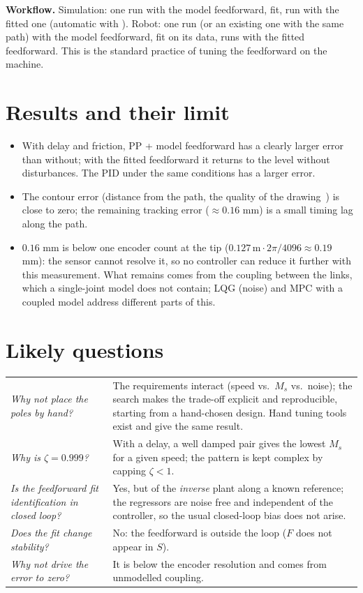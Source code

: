 \documentclass[10pt,a4paper]{article}
\newcommand{\code}[1]{\texttt{\detokenize{#1}}}
\begin{document}
\textbf{Workflow.} Simulation: one run with the model feedforward, fit, run with the fitted one (automatic with
\code{ff_source='sim'}). Robot: one run (or an existing one with the same path) with the model feedforward, fit on its data,
runs with the fitted feedforward. This is the standard practice of tuning the feedforward on the machine.

\section{Results and their limit}

\begin{itemize}
  \item With delay and friction, PP + model feedforward has a clearly larger error than without; with the fitted feedforward it
        returns to the level without disturbances. The PID under the same conditions has a larger error.
  \item The contour error (distance from the path, the quality of the drawing~\cite{koren80}) is close to zero; the remaining
        tracking error ($\approx0.16$ mm) is a small timing lag along the path.
  \item $0.16$ mm is below one encoder count at the tip ($0.127\,\text{m}\cdot2\pi/4096\approx0.19$ mm): the sensor cannot
        resolve it, so no controller can reduce it further with this measurement. What remains comes from the coupling between the
        links, which a single-joint model does not contain; LQG (noise) and MPC with a coupled model address different parts of
        this.
\end{itemize}

\section*{Likely questions}
\begin{tabularx}{\linewidth}{@{}>{\itshape}p{5.2cm} X@{}}
\toprule
Why not place the poles by hand? & The requirements interact (speed vs.\ $M_s$ vs.\ noise); the search makes the trade-off
  explicit and reproducible, starting from a hand-chosen design. Hand tuning tools exist and give the same result. \\
Why is $\zeta=0.999$? & With a delay, a well damped pair gives the lowest $M_s$ for a given speed; the pattern is kept complex by
  capping $\zeta<1$. \\
Is the feedforward fit identification in closed loop? & Yes, but of the \emph{inverse} plant along a known reference; the
  regressors are noise free and independent of the controller, so the usual closed-loop bias does not arise. \\
Does the fit change stability? & No: the feedforward is outside the loop ($F$ does not appear in $S$). \\
Why not drive the error to zero? & It is below the encoder resolution and comes from unmodelled coupling. \\
\bottomrule
\end{tabularx}
\end{document}
